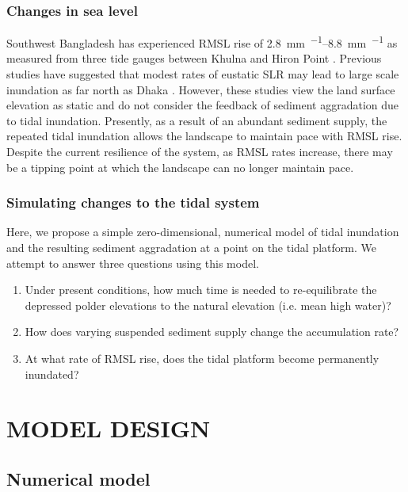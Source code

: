 \documentclass{wscpaperproc}
\theoremstyle{wsc}
\begin{document}
\subsubsection{Changes in sea level}

Southwest Bangladesh has experienced RMSL rise of \SIrange{2.8}{8.8}{\milli\meter\per\year} as measured from three tide gauges between Khulna and Hiron Point \cite{pethickRapidRiseEffective2013}. Previous studies have suggested that modest rates of eustatic SLR may lead to large scale inundation as far north as Dhaka \cite{huqSeaLevelRiseBangladesh1995,aliVulnerabilityBangladeshClimate1996,sarwarImpactsSeaLevel2005}. However, these studies view the land surface elevation as static and do not consider the feedback of sediment aggradation due to tidal inundation. Presently, as a result of an abundant sediment supply, the repeated tidal inundation allows the landscape to maintain pace with RMSL rise. Despite the current resilience of the system, as RMSL rates increase, there may be a tipping point at which the landscape can no longer maintain pace.

\subsubsection*{Simulating changes to the tidal system}

Here, we propose a simple zero-dimensional, numerical model of tidal inundation and the resulting sediment aggradation at a point on the tidal platform. We attempt to answer three questions using this model.

\begin{enumerate}
	\item Under present conditions, how much time is needed to re-equilibrate the depressed polder elevations to the natural elevation (i.e. mean high water)?
	\item How does varying suspended sediment supply change the accumulation rate?
	\item At what rate of RMSL rise, does the tidal platform become permanently inundated?
\end{enumerate}

\section{MODEL DESIGN}

\subsection{Numerical model}
\end{document}
